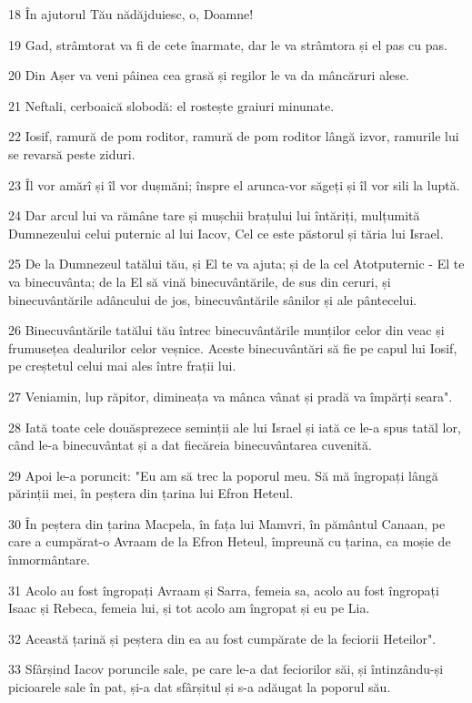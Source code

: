 \par 18 În ajutorul Tău nădăjduiesc, o, Doamne!
\par 19 Gad, strâmtorat va fi de cete înarmate, dar le va strâmtora și el pas cu pas.
\par 20 Din Așer va veni pâinea cea grasă și regilor le va da mâncăruri alese.
\par 21 Neftali, cerboaică slobodă: el rostește graiuri minunate.
\par 22 Iosif, ramură de pom roditor, ramură de pom roditor lângă izvor, ramurile lui se revarsă peste ziduri.
\par 23 Îl vor amărî și îl vor dușmăni; înspre el arunca-vor săgeți și îl vor sili la luptă.
\par 24 Dar arcul lui va rămâne tare și mușchii brațului lui întăriți, mulțumită Dumnezeului celui puternic al lui Iacov, Cel ce este păstorul și tăria lui Israel.
\par 25 De la Dumnezeul tatălui tău, și El te va ajuta; și de la cel Atotputernic - El te va binecuvânta; de la El să vină binecuvântările, de sus din ceruri, și binecuvântările adâncului de jos, binecuvântările sânilor și ale pântecelui.
\par 26 Binecuvântările tatălui tău întrec binecuvântările munților celor din veac și frumusețea dealurilor celor veșnice. Aceste binecuvântări să fie pe capul lui Iosif, pe creștetul celui mai ales între frații lui.
\par 27 Veniamin, lup răpitor, dimineața va mânca vânat și pradă va împărți seara".
\par 28 Iată toate cele douăsprezece seminții ale lui Israel și iată ce le-a spus tatăl lor, când le-a binecuvântat și a dat fiecăreia binecuvântarea cuvenită.
\par 29 Apoi le-a poruncit: "Eu am să trec la poporul meu. Să mă îngropați lângă părinții mei, în peștera din țarina lui Efron Heteul.
\par 30 În peștera din țarina Macpela, în fața lui Mamvri, în pământul Canaan, pe care a cumpărat-o Avraam de la Efron Heteul, împreună cu țarina, ca moșie de înmormântare.
\par 31 Acolo au fost îngropați Avraam și Sarra, femeia sa, acolo au fost îngropați Isaac și Rebeca, femeia lui, și tot acolo am îngropat și eu pe Lia.
\par 32 Această țarină și peștera din ea au fost cumpărate de la feciorii Heteilor".
\par 33 Sfârșind Iacov poruncile sale, pe care le-a dat feciorilor săi, și întinzându-și picioarele sale în pat, și-a dat sfârșitul și s-a adăugat la poporul său.

